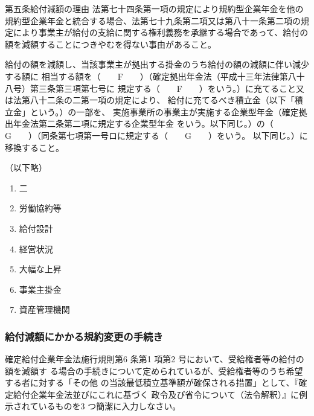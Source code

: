 \begin{fillblank}[数理人試験 \ 2024 \ 問題1 \ 設問2]
\begin{lawstructure}
\begin{lawarticle}{第五条}{給付減額の理由}
        法第七十四条第一項の規定により規約型企業年金を他の規約型企業年金と統合する場合、法第七十九条第二項又は第八十一条第二項の規定により事業主が給付の支給に関する権利義務を承継する場合であって、給付の額を減額することにつきやむを得ない事由があること。

        給付の額を減額し、当該事業主が拠出する掛金のうち給付の額の減額に伴い減少する額に
        相当する額を（　　F　　）（確定拠出年金法（平成十三年法律第八十八号）第三条第三項第七号に
        規定する（　　F　　）をいう。）に充てること又は法第八十二条の二第一項の規定により、
        給付に充てるべき積立金（以下「積立金」という。）の一部を、
        実施事業所の事業主が実施する企業型年金（確定拠出年金法第二条第二項に規定する企業型年金
        をいう。以下同じ。）の（　　G　　）（同条第七項第一号ロに規定する（　　G　　）をいう。
        以下同じ。）に移換すること。

        （以下略）
    \end{lawarticle}
  \end{lawstructure}
\end{fillblank}

\begin{answerbox}
  \begin{enumerate}[A:]
    \item 二
    \item 労働協約等
    \item 給付設計
    \item 経営状況
    \item 大幅な上昇
    \item 事業主掛金
    \item 資産管理機関
  \end{enumerate}  
\end{answerbox}

\newpage

\subsubsection{給付減額にかかる規約変更の手続き}

\begin{shortanswer}[年金1 \  2022 \ 問題2(1)イ]
  確定給付企業年金法施行規則第6 条第1 項第2 号において、受給権者等の給付の額を減額す
る場合の手続きについて定められているが、受給権者等のうち希望する者に対する「その他
の当該最低積立基準額が確保される措置」として、『確定給付企業年金法並びにこれに基づく
政令及び省令について（法令解釈）』に例示されているものを3 つ簡潔に入力しなさい。
\end{shortanswer}

